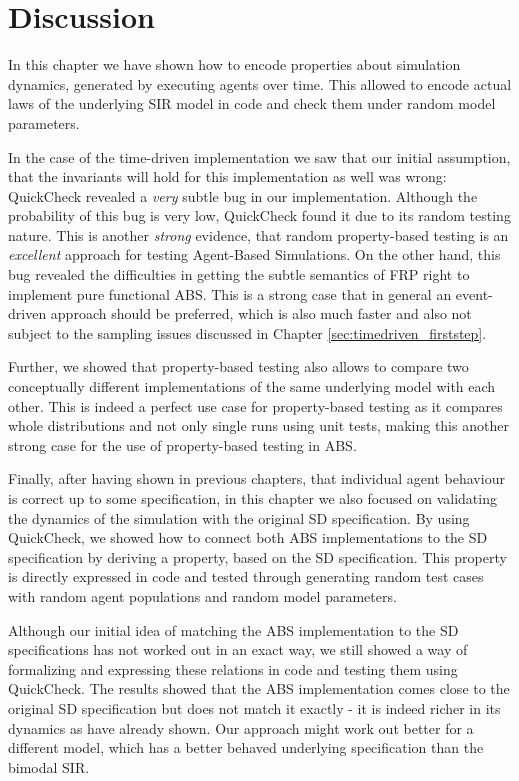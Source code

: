 \section{Discussion}
In this chapter we have shown how to encode properties about simulation dynamics, generated by executing agents over time. This allowed to encode actual laws of the underlying SIR model in code and check them under random model parameters.

In the case of the time-driven implementation we saw that our initial assumption, that the invariants will hold for this implementation as well was wrong: QuickCheck revealed a \textit{very} subtle bug in our implementation. Although the probability of this bug is very low, QuickCheck found it due to its random testing nature. This is another \textit{strong} evidence, that random property-based testing is an \textit{excellent} approach for testing Agent-Based Simulations. On the other hand, this bug revealed the difficulties in getting the subtle semantics of FRP right to implement pure functional ABS. This is a strong case that in general an event-driven approach should be preferred, which is also much faster and also not subject to the sampling issues discussed in Chapter \ref{sec:timedriven_firststep}.

Further, we showed that property-based testing also allows to compare two conceptually different implementations of the same underlying model with each other. This is indeed a perfect use case for property-based testing as it compares whole distributions and not only single runs using unit tests, making this another strong case for the use of property-based testing in ABS.

Finally, after having shown in previous chapters, that individual agent behaviour is correct up to some specification, in this chapter we also focused on validating the dynamics of the simulation with the original SD specification. By using QuickCheck, we showed how to connect both ABS implementations to the SD specification by deriving a property, based on the SD specification. This property is directly expressed in code and tested through generating random test cases with random agent populations and random model parameters. 

Although our initial idea of matching the ABS implementation to the SD specifications has not worked out in an exact way, we still showed a way of formalizing and expressing these relations in code and testing them using \\ QuickCheck. The results showed that the ABS implementation comes close to the original SD specification but does not match it exactly - it is indeed richer in its dynamics as \cite{figueredo_comparing_2014,macal_agent-based_2010} have already shown. Our approach might work out better for a different model, which has a better behaved underlying specification than the bimodal SIR.

